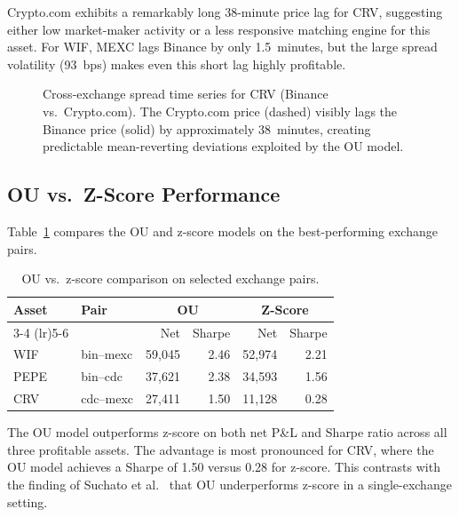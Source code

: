 \documentclass[sigconf,nonacm=false]{acmart}
\begin{document}
Crypto.com exhibits a remarkably long 38-minute price lag for CRV, suggesting either low market-maker activity or a less responsive matching engine for this asset. For WIF, MEXC lags Binance by only 1.5~minutes, but the large spread volatility (93~bps) makes even this short lag highly profitable.

\begin{figure}[h]
\centering
{}
\caption{Cross-exchange spread time series for CRV (Binance vs.\ Crypto.com). The Crypto.com price (dashed) visibly lags the Binance price (solid) by approximately 38~minutes, creating predictable mean-reverting deviations exploited by the OU model.}
\label{fig:spread_ts}
\end{figure}

\subsection{OU vs.\ Z-Score Performance}

Table~\ref{tab:ou_vs_zscore} compares the OU and z-score models on the best-performing exchange pairs.

\begin{table}[h]
\caption{OU vs.\ z-score comparison on selected exchange pairs.}
\label{tab:ou_vs_zscore}
\begin{tabular}{llrrrr}
\toprule
\textbf{Asset} & \textbf{Pair} & \multicolumn{2}{c}{\textbf{OU}} & \multicolumn{2}{c}{\textbf{Z-Score}} \\
\cmidrule(lr){3-4} \cmidrule(lr){5-6}
 & & Net & Sharpe & Net & Sharpe \\
\midrule
WIF  & bin--mexc  & 59,045 & 2.46 & 52,974 & 2.21 \\
PEPE & bin--cdc   & 37,621 & 2.38 & 34,593 & 1.56 \\
CRV  & cdc--mexc  & 27,411 & 1.50 & 11,128 & 0.28 \\
\bottomrule
\end{tabular}
\end{table}

The OU model outperforms z-score on both net P\&L and Sharpe ratio across all three profitable assets. The advantage is most pronounced for CRV, where the OU model achieves a Sharpe of 1.50 versus 0.28 for z-score. This contrasts with the finding of Suchato et al.~\cite{suchato2024application} that OU underperforms z-score in a single-exchange setting.
\end{document}
